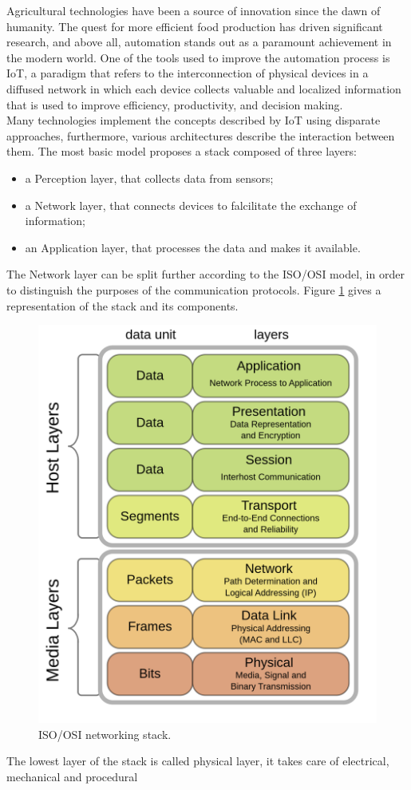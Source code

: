 Agricultural technologies have been a source of innovation since the dawn of humanity. The quest for more efficient food
production has driven significant research, and above all, automation stands out as a paramount achievement in the
modern world. One of the tools used to improve the automation process is \gls{IoT}, a paradigm that refers to the interconnection
of physical devices in a diffused network in which each device collects valuable and localized information that is used to
improve efficiency, productivity, and decision making.\\
Many technologies implement the concepts described by \gls{IoT} using disparate approaches, furthermore, various
architectures describe the interaction between them. The most basic model proposes a stack composed of three layers:
\begin{itemize}
    \item a Perception layer, that collects data from sensors;
    \item a Network layer, that connects devices to falcilitate the exchange of information;
    \item an Application layer, that processes the data and makes it available.
\end{itemize}
The Network layer can be split further according to the \gls{ISO/OSI} model, in order to distinguish the purposes of the
communication protocols. Figure \ref{img: iso_osi} gives a representation of the stack and its components.
\begin{figure}[ht]
    \centering
    \includegraphics[width=0.5\linewidth]{images/iso_osi.png}
    \caption{ISO/OSI networking stack.}
    \label{img: iso_osi}
\end{figure}
The lowest layer of the stack is called physical layer, it takes care of electrical, mechanical and procedural
